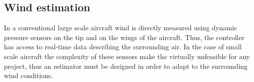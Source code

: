 \documentclass[conference]{IEEEtran}
\begin{document}
\subsection{Wind estimation}
\par
In a conventional large scale aircraft wind is directly measured using dynamic
pressure sensors on the tip and on the wings of the aircraft. Thus, the
controller has access to real-time data describing the surrounding air. In the
case of small scale aircraft the complexity of these sensors make the virtually
unfeasible for any project, thus an estimator must be designed in order to
adapt to the surrounding wind conditions.
\end{document}
